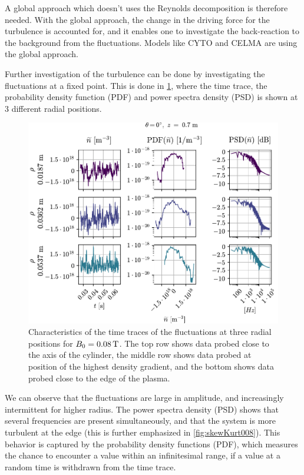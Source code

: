A global approach which doesn't uses the Reynolds decomposition is therefore needed.
With the global approach, the change in the driving force for the turbulence is accounted for, and it enables one to investigate the back-reaction to the background from the fluctuations.
Models like CYTO \cite{Naulin2008,Windisch2011a,Windisch2011b} and CELMA are using the global approach.

Further investigation of the turbulence can be done by investigating the fluctuations at a fixed point.
This is done in \cref{fig:combinedPlots008}, where the time trace, the probability density function (PDF) and power spectra density (PSD) is shown at $3$ different radial positions.
%
\begin{figure}[htb]
    \centering
    \includegraphics{fig/results/combinedPlots/008T}
    \caption{Characteristics of the time traces of the fluctuations at three radial positions for $B_0=0.08\, \text{T}$.
        The top row shows data probed close to the axis of the cylinder,
        the middle row shows data probed at position of the highest density gradient,
        and the bottom shows data probed close to the edge of the plasma.
    }
    \label{fig:combinedPlots008}
\end{figure}
%
We can observe that the fluctuations are large in amplitude, and increasingly intermittent for higher radius.
The power spectra density (PSD) shows that several frequencies are present simultaneously, and that the system is more turbulent at the edge (this is further emphasized in \cref{fig:skewKurt008}).
This behavior is captured by the probability density functions (PDF), which measures the chance to encounter a value within an infinitesimal range, if a value at a random time is withdrawn from the time trace.
